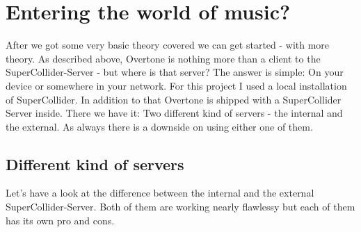 \chapter{Entering the world of music?}
After we got some very basic theory covered we can get started - with more theory. As described above, Overtone is nothing more than a client to the SuperCollider-Server - but where is that server? The answer is simple: On your device or somewhere in your network.
For this project I used a local installation of SuperCollider. In addition to that Overtone is shipped with a SuperCollider Server inside. There we have it: Two different kind of servers - the internal and the external. As always there is a downside on using either one of them.

\section{Different kind of servers}
Let's have a look at the difference between the internal and the external SuperCollider-Server. Both of them are working nearly flawlessy but each of them has its own pro and cons.
